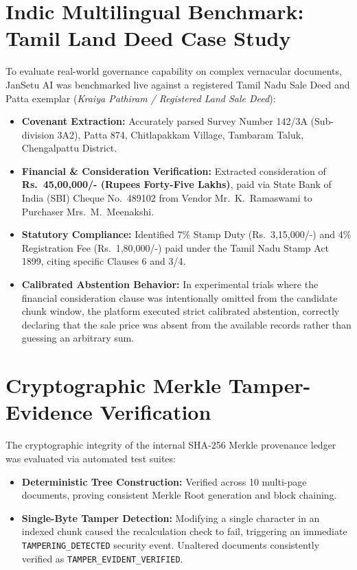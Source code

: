 \documentclass[12pt,a4paper,oneside]{report}
\begin{document}
\section{Indic Multilingual Benchmark: Tamil Land Deed Case Study}
To evaluate real-world governance capability on complex vernacular documents, JanSetu AI was benchmarked live against a registered Tamil Nadu Sale Deed and Patta exemplar (\textit{Kraiya Pathiram / Registered Land Sale Deed}):
\begin{itemize}[itemsep=2pt]
    \item \textbf{Covenant Extraction:} Accurately parsed Survey Number 142/3A (Sub-division 3A2), Patta 874, Chitlapakkam Village, Tambaram Taluk, Chengalpattu District.
    \item \textbf{Financial \& Consideration Verification:} Extracted consideration of \textbf{Rs.~45,00,000/- (Rupees Forty-Five Lakhs)}, paid via State Bank of India (SBI) Cheque No.~489102 from Vendor Mr.~K.~Ramaswami to Purchaser Mrs.~M.~Meenakshi.
    \item \textbf{Statutory Compliance:} Identified 7\% Stamp Duty (Rs.~3,15,000/-) and 4\% Registration Fee (Rs.~1,80,000/-) paid under the Tamil Nadu Stamp Act 1899, citing specific Clauses 6 and 3/4.
    \item \textbf{Calibrated Abstention Behavior:} In experimental trials where the financial consideration clause was intentionally omitted from the candidate chunk window, the platform executed strict calibrated abstention, correctly declaring that the sale price was absent from the available records rather than guessing an arbitrary sum.
\end{itemize}

\section{Cryptographic Merkle Tamper-Evidence Verification}
The cryptographic integrity of the internal SHA-256 Merkle provenance ledger was evaluated via automated test suites:
\begin{itemize}[itemsep=2pt]
    \item \textbf{Deterministic Tree Construction:} Verified across 10 multi-page documents, proving consistent Merkle Root generation and block chaining.
    \item \textbf{Single-Byte Tamper Detection:} Modifying a single character in an indexed chunk caused the recalculation check to fail, triggering an immediate \texttt{TAMPERING\_DETECTED} security event. Unaltered documents consistently verified as \texttt{TAMPER\_EVIDENT\_VERIFIED}.
\end{itemize}
\end{document}
